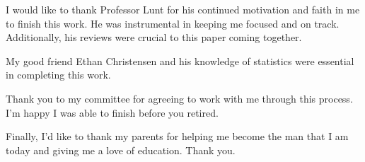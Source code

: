 \afterpage{\cleardoublepage}%
I would like to thank Professor Lunt for his continued motivation and faith in me to finish this work. He was instrumental in keeping me focused and on track. Additionally, his reviews were crucial to this paper coming together.

My good friend Ethan Christensen and his knowledge of statistics were essential in completing this work.

Thank you to my committee for agreeing to work with me through this process. I'm happy I was able to finish before you retired.

Finally, I'd like to thank my parents for helping me become the man that I am today and giving me a love of education. Thank you.
